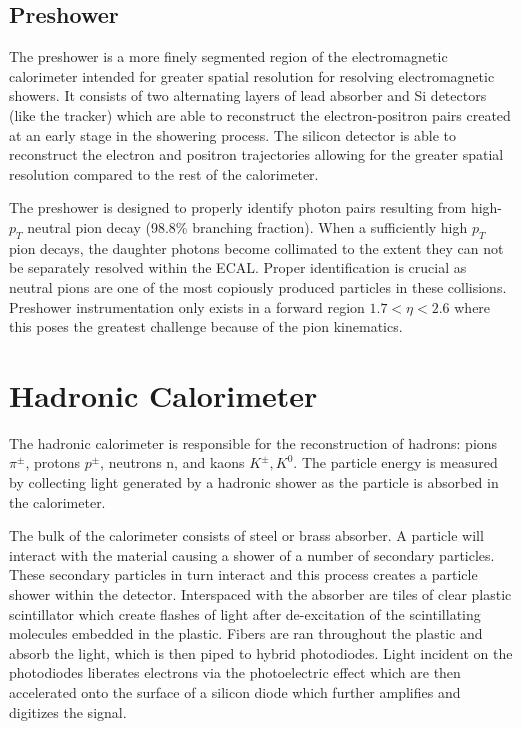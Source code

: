 \subsection{Preshower}

The preshower is a more finely segmented region of the electromagnetic calorimeter intended for greater spatial resolution for resolving electromagnetic showers. It consists of two alternating layers of lead absorber and Si detectors (like the tracker) which are able to reconstruct the electron-positron pairs created at an early stage in the showering process. The silicon detector is able to reconstruct the electron and positron trajectories allowing for the greater spatial resolution compared to the rest of the calorimeter.

The preshower is designed to properly identify photon pairs resulting from high-$p_{T}$ neutral pion decay (98.8\% branching fraction). When a sufficiently high $p_{T}$ pion decays, the daughter photons become collimated to the extent they can not be separately resolved within the ECAL. Proper identification is crucial as neutral pions are one of the most copiously produced particles in these collisions. Preshower instrumentation only exists in a forward region $1.7<\eta<2.6$ where this poses the greatest challenge because of the pion kinematics.

\section{Hadronic Calorimeter}

The hadronic calorimeter is responsible for the reconstruction of hadrons: pions $\pi^{\pm}$, protons $p^{\pm}$, neutrons n, and kaons $K^{\pm}, K^{0}$. The particle energy is measured by collecting light generated by a hadronic shower as the particle is absorbed in the calorimeter.\cite{hcaltdr}

The bulk of the calorimeter consists of steel or brass absorber. A particle will interact with the material causing a shower of a number of secondary particles. These secondary particles in turn interact and this process creates a particle shower within the detector.  Interspaced with the absorber are tiles of clear plastic scintillator which create flashes of light after de-excitation of the scintillating molecules embedded in the plastic. Fibers are ran throughout the plastic and absorb the light, which is then piped to hybrid photodiodes. Light incident on the photodiodes liberates electrons via the photoelectric effect which are then accelerated onto the surface of a silicon diode which further amplifies and digitizes the signal.

